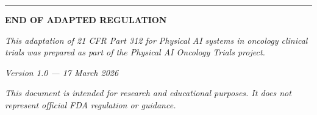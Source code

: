 \documentclass[11pt]{article}
\begin{document}
\vspace{1cm}

\noindent\rule{\textwidth}{0.4pt}

\vspace{0.5cm}

\begin{center}
\textbf{END OF ADAPTED REGULATION}

\vspace{0.3cm}

\textit{This adaptation of 21 CFR Part 312 for Physical AI systems in oncology clinical trials was prepared as part of the Physical AI Oncology Trials project.}

\vspace{0.2cm}

\textit{Version 1.0 --- 17 March 2026}

\vspace{0.2cm}

\textit{This document is intended for research and educational purposes. It does not represent official FDA regulation or guidance.}
\end{center}
\end{document}
